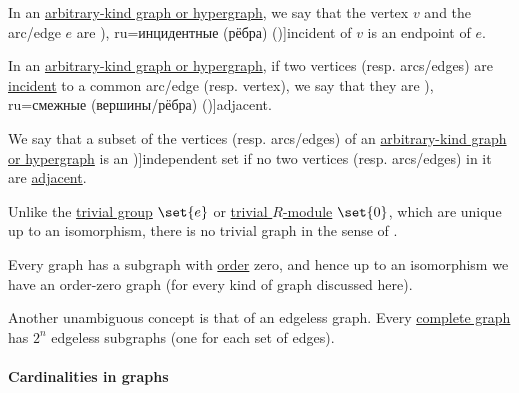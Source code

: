 \begin{definition}\label{def:graph_incidence}
  In an \hyperref[rem:arbitrary_kind_graph]{arbitrary-kind graph or hypergraph}, we say that the vertex \( v \) and the arc/edge \( e \) are \term[bg=инцидентни (ребра) (\cite[7]{Мирчев2001Графи}), ru=инцидентные (рёбра) (\cite[9]{ЕмеличевИПр1990Графы})]{incident} of \( v \) is an endpoint of \( e \).
\end{definition}

\begin{definition}\label{def:graph_adjacency}
  In an \hyperref[rem:arbitrary_kind_graph]{arbitrary-kind graph or hypergraph}, if two vertices (resp. arcs/edges) are \hyperref[def:graph_incidence]{incident} to a common arc/edge (resp. vertex), we say that they are \term[bg=съседни (върхове/дъги/ребра) (\cite[7]{Мирчев2001Графи}), ru=смежные (вершины/рёбра) (\cite[9]{ЕмеличевИПр1990Графы})]{adjacent}.
\end{definition}

\begin{definition}\label{def:graph_independent_set}
  We say that a subset of the vertices (resp. arcs/edges) of an \hyperref[rem:arbitrary_kind_graph]{arbitrary-kind graph or hypergraph} is an \term[bg=независимо множество (\cite[103]{Мирчев2001Графи})]{independent set} if no two vertices (resp. arcs/edges) in it are \hyperref[def:graph_adjacency]{adjacent}.
\end{definition}

\begin{remark}\label{rem:trivial_graph}
  Unlike the \hyperref[def:group/trivial]{trivial group} \( \set{ e } \) or \hyperref[def:module/trivial]{trivial \( R \)-module} \( \set{ 0 } \), which are unique up to an isomorphism, there is no trivial graph in the sense of .

  Every graph has a subgraph with \hyperref[def:graph_cardinality/order]{order} zero, and hence up to an isomorphism we have an order-zero graph (for every kind of graph discussed here).

  Another unambiguous concept is that of an edgeless graph. Every \hyperref[def:complete_graph]{complete graph} has \( 2^n \) edgeless subgraphs (one for each set of edges).
\end{remark}

\paragraph{Cardinalities in graphs}

